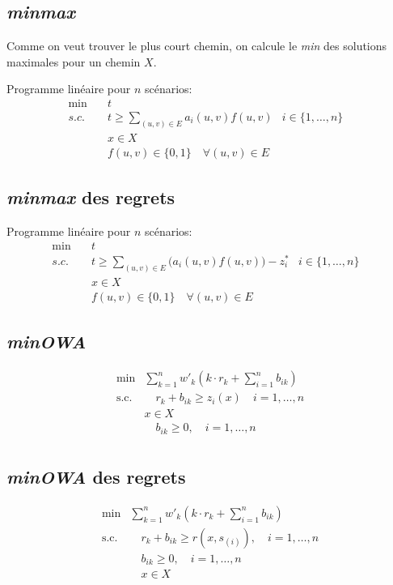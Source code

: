 \documentclass[10pt,a4paper]{report}
\begin{document}
\subsection*{\textit{minmax}}
Comme on veut trouver le plus court chemin, on calcule le \textit{min} des solutions maximales pour un chemin $X$.

Programme linéaire pour $n$ scénarios:
\begin{align*}
\min\quad   & t&&\\
s.c.\quad   &t\ge\sum_{(u,v)\in E} a_i(u,v)f(u,v)&i\in\{1,\ldots,n\}\\
                & x \in X\\
            &f(u,v)\in \{0,1\} \quad \forall (u,v) \in E&
\end{align*}
\subsection*{\textit{minmax} des regrets}
Programme linéaire pour $n$ scénarios:
\begin{align*}
\min\quad   & t&&\\
s.c.\quad   &t\ge\sum_{(u,v)\in E} \bigl(a_i(u,v)f(u,v)\bigl)-z_i^*&i\in\{1,\ldots,n\}\\
                & x \in X\\
            &f(u,v)\in \{0,1\} \quad \forall (u,v) \in E&
\end{align*}
\subsection*{\textit{minOWA}}
\begin{align*}
\min            &\sum_{k=1}^n w'_k \left( k \cdot r_k + \sum_{i=1}^n b_{ik} \right) \\
\text{s.c.}     & \quad r_k + b_{ik} \geq z_i(x) \quad i = 1,\ldots,n\\
                & x \in X\\
                & \quad b_{ik} \geq 0, \quad i = 1, \dots, n \\
\end{align*}
\subsection*{\textit{minOWA} des regrets}
\begin{align*}
\min &\sum_{k=1}^n w'_k \left( k \cdot r_k + \sum_{i=1}^n b_{ik} \right) \\
\text{s.c.} & \quad r_k + b_{ik} \geq r(x,s_{(i)}), \quad i = 1, \dots, n \\
& \quad b_{ik} \geq 0, \quad i = 1, \dots, n \\
& \quad x \in X
\end{align*}
\end{document}
